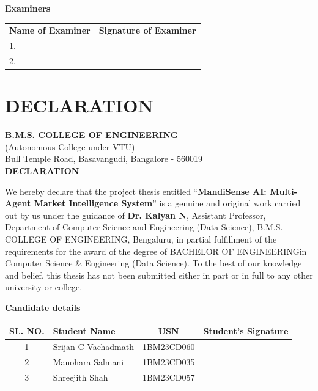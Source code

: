 \documentclass[12pt,a4paper]{report}
\newcommand{\ApplyBorder}{%
}
\newcommand{\CollegeName}{B.M.S. COLLEGE OF ENGINEERING}
\newcommand{\CollegeSubtitle}{(Autonomous College under VTU)}
\newcommand{\CollegeAddress}{Bull Temple Road, Basavangudi, Bangalore - 560019}
\newcommand{\Department}{Department of Computer Science and Engineering (Data Science)}
\newcommand{\ProjectTitle}{MandiSense AI: Multi-Agent Market Intelligence System}
\newcommand{\Degree}{BACHELOR OF ENGINEERING}
\newcommand{\Programme}{Computer Science \& Engineering (Data Science)}
\newcommand{\GuideName}{Dr. Kalyan N}
\newcommand{\GuideDesignation}{Assistant Professor}
\newcommand{\StudentA}{Srijan C Vachadmath}
\newcommand{\USNA}{1BM23CD060}
\newcommand{\StudentB}{Manohara Salmani}
\newcommand{\USNB}{1BM23CD035}
\newcommand{\StudentC}{Shreejith Shah}
\newcommand{\USNC}{1BM23CD057}
\begin{document}
\vspace{1.0cm}
\noindent\textbf{Examiners}\\[4pt]
\begin{tabularx}{\textwidth}{X X}
\textbf{Name of Examiner} & \textbf{Signature of Examiner} \\
1. \hrulefill & \hrulefill \\
2. \hrulefill & \hrulefill \\
\end{tabularx}

\clearpage

\chapter*{DECLARATION}
\thispagestyle{plain}
\ApplyBorder

\vspace*{1.4cm}
\begin{center}
    {\color{bmsblue}\bfseries\Large \CollegeName}\\[3pt]
    {\large \CollegeSubtitle}\\[3pt]
    {\large \CollegeAddress}\\[1.0cm]
    {\LARGE\bfseries DECLARATION}
\end{center}

\vspace{1cm}
\begin{minipage}{0.93\textwidth}
\setlength{\parindent}{1.2cm}
\setlength{\parskip}{0.45em}
\justifying
We hereby declare that the project thesis entitled ``\textbf{\ProjectTitle}'' is a genuine and original work carried out by us under the guidance of \textbf{\GuideName}, \GuideDesignation, \Department, \CollegeName, Bengaluru, in partial fulfillment of the requirements for the award of the degree of \Degree in \Programme. To the best of our knowledge and belief, this thesis has not been submitted either in part or in full to any other university or college.
\end{minipage}

\vspace{1.2cm}
\begin{center}
    {\bfseries Candidate details}
\end{center}

\begin{center}
\begin{tabularx}{0.92\textwidth}{|c|X|c|c|}
\hline
\textbf{SL. NO.} & \textbf{Student Name} & \textbf{USN} & \textbf{Student's Signature} \\
\hline
1 & \StudentA & \USNA & \\
\hline
2 & \StudentB & \USNB & \\
\hline
3 & \StudentC & \USNC & \\
\hline
\end{tabularx}
\end{center}
\end{document}
